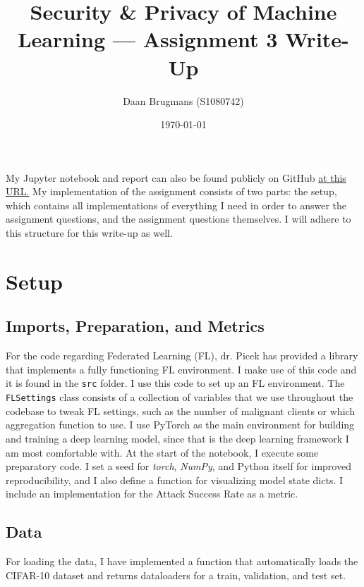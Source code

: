 \documentclass{article}
\begin{document}
\title{Security \& Privacy of Machine Learning --- Assignment 3 Write-Up}
\author{Daan Brugmans (S1080742)}
\date{\today}

\maketitle

My Jupyter notebook and report can also be found publicly on GitHub \href{https://github.com/daanbrugmans/ru-security-and-privacy-of-machine-learning-23-24/tree/main/assignments/assignment-3}{at this URL.}
My implementation of the assignment consists of two parts: the setup, which contains all implementations of everything I need in order to answer the assignment questions, and the assignment questions themselves.
I will adhere to this structure for this write-up as well.

\section{Setup}
\subsection{Imports, Preparation, and Metrics}
For the code regarding Federated Learning (FL), dr. Picek has provided a library that implements a fully functioning FL environment.
I make use of this code and it is found in the \texttt{src} folder.
I use this code to set up an FL environment.
The \texttt{FLSettings} class consists of a collection of variables that we use throughout the codebase to tweak FL settings, such as the number of malignant clients or which aggregation function to use.
I use PyTorch as the main environment for building and training a deep learning model, since that is the deep learning framework I am most comfortable with. 
At the start of the notebook, I execute some preparatory code.
I set a seed for \textit{torch}, \textit{NumPy}, and Python itself for improved reproducibility, and I also define a function for visualizing model state dicts.
I include an implementation for the Attack Success Rate as a metric.

\subsection{Data}
For loading the data, I have implemented a function that automatically loads the CIFAR-10 dataset and returns dataloaders for a train, validation, and test set.
\end{document}

